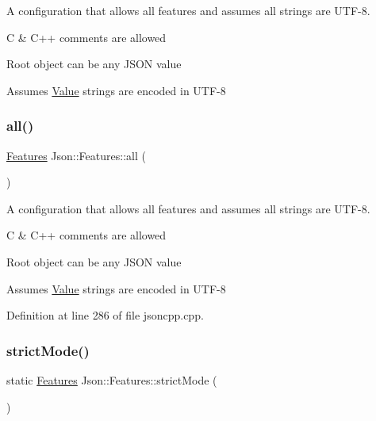 A configuration that allows all features and assumes all strings are U\+T\+F-\/8. 


\begin{DoxyItemize}
\item C \& C++ comments are allowed
\item Root object can be any J\+S\+ON value
\item Assumes \hyperlink{class_json_1_1_value}{Value} strings are encoded in U\+T\+F-\/8 
\end{DoxyItemize}\hypertarget{class_json_1_1_features_a63894da6e2c100b38741fa933f3d33ae}{}\label{class_json_1_1_features_a63894da6e2c100b38741fa933f3d33ae} 
\subsubsection{\texorpdfstring{all()}{all()}\hspace{0.1cm}{\footnotesize\ttfamily [2/2]}}
{\footnotesize\ttfamily \hyperlink{class_json_1_1_features}{Features} Json\+::\+Features\+::all (\begin{DoxyParamCaption}{ }\end{DoxyParamCaption})\hspace{0.3cm}{\ttfamily [static]}}



A configuration that allows all features and assumes all strings are U\+T\+F-\/8. 


\begin{DoxyItemize}
\item C \& C++ comments are allowed
\item Root object can be any J\+S\+ON value
\item Assumes \hyperlink{class_json_1_1_value}{Value} strings are encoded in U\+T\+F-\/8 
\end{DoxyItemize}

Definition at line 286 of file jsoncpp.\+cpp.

\hypertarget{class_json_1_1_features_aed3a2845df0cfd2ebe7338442361bd13}{}\label{class_json_1_1_features_aed3a2845df0cfd2ebe7338442361bd13} 
\subsubsection{\texorpdfstring{strict\+Mode()}{strictMode()}\hspace{0.1cm}{\footnotesize\ttfamily [1/2]}}
{\footnotesize\ttfamily static \hyperlink{class_json_1_1_features}{Features} Json\+::\+Features\+::strict\+Mode (\begin{DoxyParamCaption}{ }\end{DoxyParamCaption})\hspace{0.3cm}{\ttfamily [static]}}



